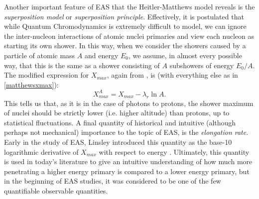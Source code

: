 Another important feature of EAS that the Heitler-Matthews model reveals is the \textit{superposition model} or \textit{superposition principle}. Effectively, it is postulated that while Quantum Chromodynamics is extremely difficult to model, we can ignore the inter-nucleon interactions of atomic nuclei primaries and view each nucleon as starting its own shower. In this way, when we consider the showers caused by a particle of atomic mass $A$ and energy $E_0$, we assume, in almost every possible way, that this is the same as a shower consisting of $A$ subshowers of energy $E_0/A$. The modified expression for $X_{max}$, again from \textcite{matthews}, is (with everything else as in \autoref{matthewsxmax}):
$$X_{max}^A=X_{max}-\lambda_r \ln A.$$
This tells us that, as it is in the case of photons to protons, the shower maximum of nuclei should be strictly lower (i.e. higher altitude) than protons, up to statistical fluctuations. A final quantity of historical and intuitive (although perhaps not mechanical) importance to the topic of EAS, is the \textit{elongation rate}. Early in the study of EAS, Linsley introduced this quantity as the base-10 logarithmic derivative of $X_{max}$ with respect to energy \cite{stanev,crapp2,matthews}. Ultimately, this quantity is used in today's literature to give an intuitive understanding of how much more penetrating a higher energy primary is compared to a lower energy primary, but in the beginning of EAS studies, it was considered to be one of the few quantifiable observable quantities.
